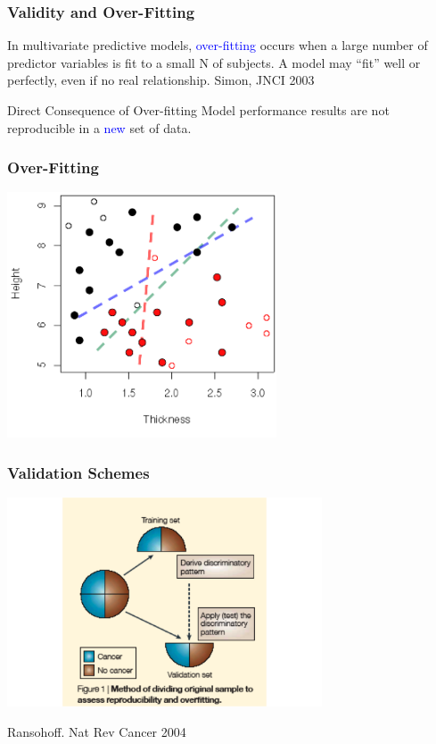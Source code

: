 \documentclass[10pt, colorlinks]{beamer}
\begin{document}
\begin{frame}
  \frametitle{Validity and Over-Fitting}
  \begin{block}{}
    In multivariate predictive models, \textcolor{blue}{over-fitting} occurs when a
    large number of predictor variables is fit to a small N of
    subjects.  A model may ``fit'' well or perfectly, even if no real
    relationship.  Simon, JNCI 2003
  \end{block}
  \pause \begin{block}{Direct Consequence of Over-fitting}
    Model performance results are not reproducible in a
    \textcolor{blue}{new} set of data. 
  \end{block}
\end{frame}

\begin{frame}
  \frametitle{Over-Fitting}
  \begin{center}
    \centering \includegraphics[width=0.6\textwidth]{figs/2vars}
  \end{center}
\end{frame}



\begin{frame}
  \frametitle{Validation Schemes}
  \begin{center}
    \centering \includegraphics[width=0.7\textwidth]{figs/crossval}
  \end{center}
\tiny{Ransohoff.  Nat Rev Cancer 2004 }
\end{frame}
\end{document}
